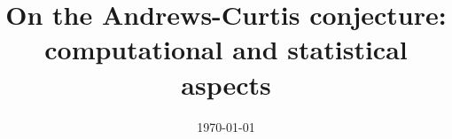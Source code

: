 \documentclass{amsart}
\title[On the Andrews-Curtis conjecture]{On the Andrews-Curtis conjecture: \\ computational and statistical aspects}
\date{\today}
\begin{document}
	
	\maketitle
	
	
	
	
	
	
	
	\appendix
	
	
	
	\sloppy
	\printbibliography
\end{document}
